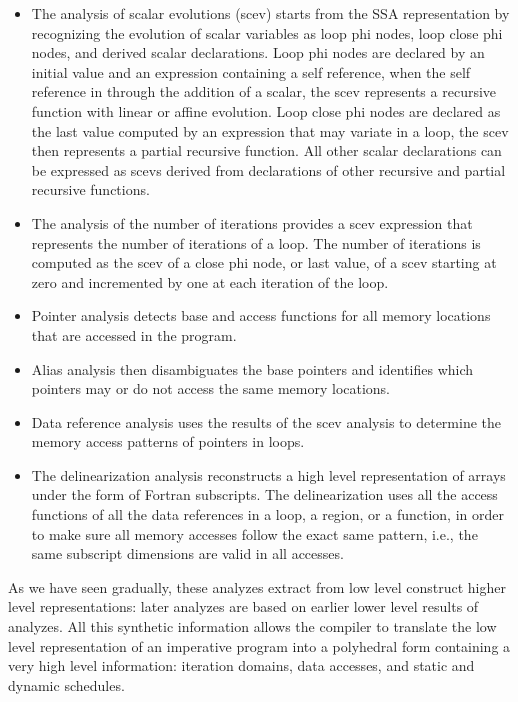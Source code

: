\documentclass{sigplanconf}
\begin{document}
\begin{itemize}
\item The analysis of scalar evolutions (scev) \cite{scev} starts from the SSA
  representation by recognizing the evolution of scalar variables as loop phi
  nodes, loop close phi nodes, and derived scalar declarations.  Loop phi nodes
  are declared by an initial value and an expression containing a self
  reference, when the self reference in through the addition of a scalar, the
  scev represents a recursive function with linear or affine evolution.  Loop
  close phi nodes are declared as the last value computed by an expression that
  may variate in a loop, the scev then represents a partial recursive function.
  All other scalar declarations can be expressed as scevs derived from
  declarations of other recursive and partial recursive functions.

\item The analysis of the number of iterations \cite{scev} provides a scev
  expression that represents the number of iterations of a loop.  The number of
  iterations is computed as the scev of a close phi node, or last value, of a
  scev starting at zero and incremented by one at each iteration of the loop.

\item Pointer analysis detects base and access functions for all memory
  locations that are accessed in the program.

\item Alias analysis then disambiguates the base pointers and identifies which
  pointers may or do not access the same memory locations.

\item Data reference analysis uses the results of the scev analysis to determine
  the memory access patterns of pointers in loops.

\item The delinearization analysis \cite{delin} reconstructs a high level
  representation of arrays under the form of Fortran subscripts.  The
  delinearization uses all the access functions of all the data references in a
  loop, a region, or a function, in order to make sure all memory accesses
  follow the exact same pattern, i.e., the same subscript dimensions are valid
  in all accesses.
\end{itemize}

As we have seen gradually, these analyzes extract from low level construct
higher level representations: later analyzes are based on earlier lower level
results of analyzes.  All this synthetic information allows the compiler to
translate the low level representation of an imperative program into a
polyhedral form \cite{} containing a very high level information: iteration
domains, data accesses, and static and dynamic schedules.
\end{document}
